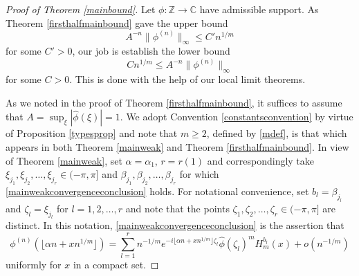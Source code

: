 \documentclass{article}
\theoremstyle{theorem}
\theoremstyle{remark}
\begin{document}
\begin{proof}[Proof of Theorem \ref{mainbound}]
Let $\phi:\mathbb{Z}\rightarrow\mathbb{C}$ have admissible support. As Theorem
\ref{firsthalfmainbound} gave the upper bound
\begin{equation*}
A^{-n}\|\phi^{(n)}\|_{\infty}\leq C'n^{1/m}
\end{equation*}
for some $C'>0$, our job is establish the lower bound
\begin{equation*}
Cn^{1/m}\leq A^{-n}\|\phi^{(n)}\|_{\infty} 
\end{equation*}
for some $C>0$. This is done with the help of our local limit theorems.

As we noted in the proof of Theorem \ref{firsthalfmainbound}, it suffices to
assume that $A=\sup_{\xi}|\hat{\phi}(\xi)|=1$. We adopt Convention \ref{constantsconvention} by virtue of Proposition \ref{typesprop} and note that $m\geq2$, defined by \eqref{mdef}, is that which appears in both Theorem \ref{mainweak} and Theorem \ref{firsthalfmainbound}. In view of Theorem \ref{mainweak}, set $\alpha=\alpha_1$, $r=r(1)$ and correspondingly take $\xi_{j_1},\xi_{j_2},\dots,\xi_{j_{r}}\in(-\pi,\pi]$ and $\beta_{j_1},\beta_{j_2},\dots,\beta_{j_{r}}$ for which \eqref{mainweakconvergenceconclusion} holds. For notational convenience, set $b_l=\beta_{j_l}$ and $\zeta_l=\xi_{j_l}$ for $l=1,2,\dots, r$ and note that the points $\zeta_1,\zeta_2,\dots,\zeta_r\in(-\pi,\pi]$ are distinct. In this notation, \eqref{mainweakconvergenceconclusion} is the assertion that
\begin{equation}\label{lowerboundlimiteq}
 \phi^{(n)}(\lfloor\alpha n+xn^{1/m}\rfloor)=\sum_{l=1}^{r}n^{-1/m}e^{-i\lfloor\alpha n+xn^{1/m}\rfloor\zeta_l}\hat{\phi}(\zeta_l)^m H_m^{b_l}(x)+o(n^{-1/m})
\end{equation}
uniformly for $x$ in a compact set.



\end{proof}
\end{document}
